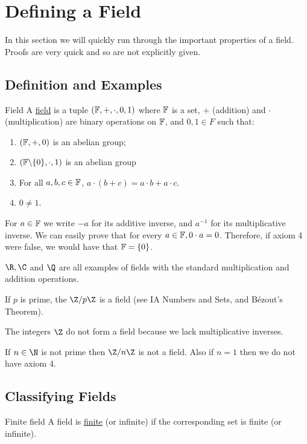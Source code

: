 \documentclass[../Main.tex]{subfiles}
\begin{document}
\section{Defining a Field}
In this section we will quickly run through the important properties of a field. Proofs are very quick and so are not explicitly given.
\subsection{Definition and Examples}
\begin{definition}{Field}
    A \underline{field} is a tuple $(\mathbb{F}, +, \cdot, 0, 1)$ where $\mathbb{F}$ is a set, $+$ (addition) and $\cdot$ (multiplication) are binary operations on $\mathbb{F}$, and $0, 1 \in F$ such that:
    \begin{enumerate}
        \item $(\mathbb{F}, +, 0)$ is an abelian group;
        \item $(\mathbb{F} \backslash \{0\}, \cdot, 1)$ is an abelian group
        \item For all $a, b, c \in \mathbb{F}$, $a \cdot (b + c) = a \cdot b + a \cdot c$.
        \item $0 \neq 1$.
    \end{enumerate}
\end{definition}
For $a \in \mathbb{F}$ we write $-a$ for its additive inverse, and $a^{-1}$ for its multiplicative inverse. We can easily prove that for every $a \in \mathbb{F}, 0 \cdot a = 0$. Therefore, if axiom 4 were false, we would have that $\mathbb{F} = \{0\}$.
\begin{examples}
    \item $\R, \C$ and $\Q$ are all examples of fields with the standard multiplication and addition operations.
    \item If $p$ is prime, the $\Z / p\Z$ is a field (see IA Numbers and Sets, and B\'ezout's Theorem).
\end{examples}
\begin{examples}
    \item The integers $\Z$ do not form a field because we lack multiplicative inverses.
    \item If $n \in \N$ is not prime then $\Z / n\Z$ is not a field. Also if $n = 1$ then we do not have axiom 4.
\end{examples}
\subsection{Classifying Fields}
\begin{definition}{Finite field}
    A field is \underline{finite} (or infinite) if the corresponding set is finite (or infinite).
\end{definition}
\end{document}
